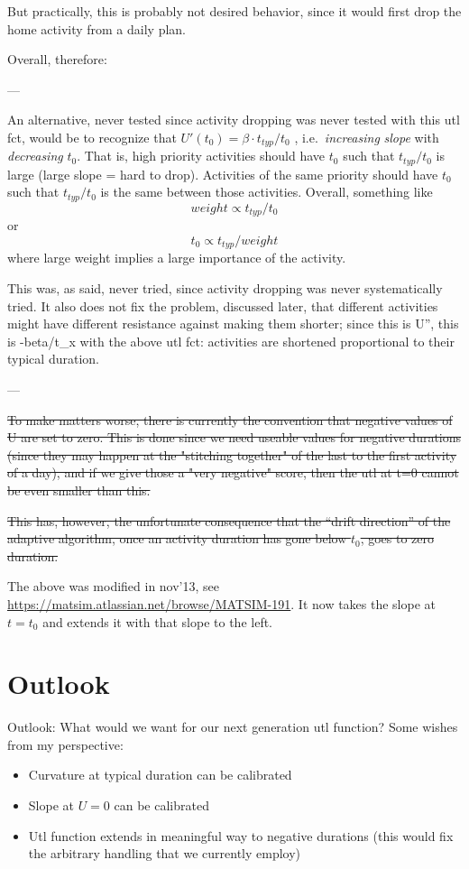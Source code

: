 But practically, this is probably not desired behavior, since it would first drop the home activity from a daily plan.

Overall, therefore: 

---

An  alternative, never tested since activity dropping was never  tested with  this utl fct, would be to recognize that $U'(t_0) = \beta \cdot  t_{typ} / t_0$ ,  i.e.\ \emph{increasing} \emph{slope} with \emph{decreasing}  $t_0$.  That is, high priority activities should have $t_0$ such that  $t_{typ}/t_0$ is  large (large slope = hard to drop). Activities of the  same priority  should have $t_0$ such that $t_{typ}/t_0$ is the same between  those activities.  Overall, something like
\[
weight \propto t_{typ}/t_0
\]
or
\[
t_0 \propto t_{typ}/weight
\]
where large weight implies a large importance of the activity.

This  was, as said, never tried, since activity dropping was never   systematically tried. It also does not fix the problem, discussed   later, that different activities might have different resistance  against  making them shorter; since this is U'', this is -beta/t\_x  with the  above utl fct: activities are shortened proportional to their  typical  duration.

---

\st{To make matters worse, there is currently the  convention that  negative values of U are set to zero. This is done  since we need  useable values for negative durations (since they may  happen at the  "stitching together" of the last to the first activity of a  day), and  if we give those a "very negative" score, then the utl at t=0  cannot be  even smaller than this.}

\st{This has, however, the  unfortunate consequence that the ``drift  direction'' of the adaptive  algorithm, once an activity duration has  gone below $t_0$, goes to zero  duration.}

The above was modified in nov'13, see \url{https://matsim.atlassian.net/browse/MATSIM-191}.  It now takes the slope at $t=t_0$ and extends it with that slope to the left.

\section{Outlook}

Outlook: What would we want for our next generation utl function? Some wishes from my perspective:
\begin{itemize}
	\item Curvature at typical duration can be calibrated
	\item Slope at $U=0$ can be calibrated
	\item Utl function extends in meaningful way to negative durations (this would fix the arbitrary handling that we currently employ)
\end{itemize}

